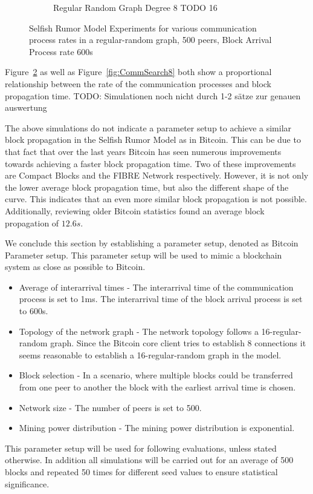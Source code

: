 \begin{figure}[ht]
\begin{subfigure}[b]{0.48\textwidth}
		\caption{Regular Random Graph Degree 8 TODO 16}
		\label{fig:CommSearch16}
	\end{subfigure}
\caption{Selfish Rumor Model Experiments for various communication process rates in a regular-random graph, 500 peers, Block Arrival Process rate 600s}
\end{figure}
Figure~\ref{fig:CommSearch16} as well as Figure~\ref{fig:CommSearch8} both show a proportional relationship between the rate of the communication processes and block propagation time. 
TODO: Simulationen noch nicht durch 1-2 sätze zur genauen auswertung

The above simulations do not indicate a parameter setup to achieve a similar block propagation in the Selfish Rumor Model as in Bitcoin. This can be due to that fact that over the last years Bitcoin has seen numerous improvements towards achieving a faster block propagation time. Two of these improvements are Compact Blocks and the FIBRE Network respectively. However, it is not only the lower average block propagation time, but also the different shape of the curve. This indicates that an even more similar block propagation is not possible.
Additionally, reviewing older Bitcoin statistics  found an average block propagation of $12.6s$.

We conclude this section by establishing a parameter setup, denoted as Bitcoin Parameter setup. This parameter setup will be used to mimic a blockchain system as close as possible to Bitcoin.
\begin{itemize}
\item Average of interarrival times - The interarrival time of the communication process is set to 1ms. The interarrival time of the block arrival process is set to 600s.
\item Topology of the network graph - The network topology follows a 16-regular-random graph. Since the Bitcoin core client tries to establish 8 connections it seems reasonable to establish a 16-regular-random graph in the model.
\item Block selection - In a scenario, where multiple blocks could be transferred from one peer to another the block with the earliest arrival time is chosen.
\item Network size - The number of peers is set to 500.
\item Mining power distribution - The mining power distribution is exponential.
\end{itemize}
This parameter setup will be used for following evaluations, unless stated otherwise. In addition all simulations will be carried out for an average of 500 blocks and repeated 50 times for different seed values to ensure statistical significance.

